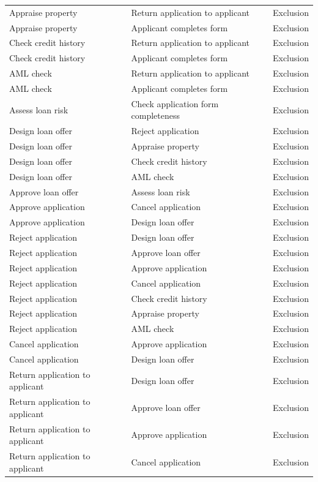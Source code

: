 \begin{longtable}{p{5.5cm} p{5.5cm} p{2cm}}
\addlinespace
\multicolumn{3}{l}{\textit{Exclusions (27)}} \\
\midrule
Appraise property & Return application to applicant & Exclusion \\
Appraise property & Applicant completes form & Exclusion \\
Check credit history & Return application to applicant & Exclusion \\
Check credit history & Applicant completes form & Exclusion \\
AML check & Return application to applicant & Exclusion \\
AML check & Applicant completes form & Exclusion \\
Assess loan risk & Check application form completeness & Exclusion \\
Design loan offer & Reject application & Exclusion \\
Design loan offer & Appraise property & Exclusion \\
Design loan offer & Check credit history & Exclusion \\
Design loan offer & AML check & Exclusion \\
Approve loan offer & Assess loan risk & Exclusion \\
Approve application & Cancel application & Exclusion \\
Approve application & Design loan offer & Exclusion \\
Reject application & Design loan offer & Exclusion \\
Reject application & Approve loan offer & Exclusion \\
Reject application & Approve application & Exclusion \\
Reject application & Cancel application & Exclusion \\
Reject application & Check credit history & Exclusion \\
Reject application & Appraise property & Exclusion \\
Reject application & AML check & Exclusion \\
Cancel application & Approve application & Exclusion \\
Cancel application & Design loan offer & Exclusion \\
Return application to applicant & Design loan offer & Exclusion \\
Return application to applicant & Approve loan offer & Exclusion \\
Return application to applicant & Approve application & Exclusion \\
Return application to applicant & Cancel application & Exclusion \\
\end{longtable}


